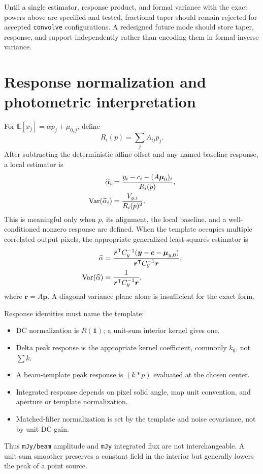 \documentclass[11pt]{article}
\newcommand{\E}{\mathbb{E}}
\newcommand{\Var}{\operatorname{Var}}
\newcommand{\code}[1]{\nolinkurl{#1}}
\begin{document}
Until a single estimator, response product, and formal variance with the exact
powers above are specified and tested, fractional taper should remain rejected
for accepted \code{convolve} configurations.  A redesigned future mode should
store taper, response, and support independently rather than encoding them in
formal inverse variance.

\section{Response normalization and photometric interpretation}
\label{sec:response}

For $\E[x_j]=\alpha p_j+\mu_{0,j}$, define
\begin{equation}
 R_i(p)=\sum_jA_{ij}p_j.
 \label{eq:template-response}
\end{equation}
After subtracting the deterministic affine offset and any named baseline
response, a local estimator is
\begin{align}
 \widehat\alpha_i&={y_i-c_i-(A\boldsymbol\mu_0)_i\over R_i(p)},
 \label{eq:alpha-hat}\\
 \Var(\widehat\alpha_i)&={V_{y,i}\over R_i(p)^2}.
 \label{eq:alpha-var}
\end{align}
This is meaningful only when $p$, its alignment, the local baseline, and a
well-conditioned nonzero response are defined.  When the template occupies
multiple correlated output pixels, the appropriate generalized least-squares
estimator is
\begin{align}
 \widehat\alpha&={\boldsymbol r^{\mathsf T}C_y^{-1}
      (\boldsymbol y-\boldsymbol c-\boldsymbol\mu_{y,0})
      \over \boldsymbol r^{\mathsf T}C_y^{-1}\boldsymbol r},
 \label{eq:gls-alpha}\\
 \Var(\widehat\alpha)&={1\over
      \boldsymbol r^{\mathsf T}C_y^{-1}\boldsymbol r},
 \label{eq:gls-alpha-var}
\end{align}
where $\boldsymbol r=A\boldsymbol p$.  A diagonal variance plane alone is
insufficient for the exact form.

Response identities must name the template:
\begin{itemize}
\item DC normalization is $R(\boldsymbol1)$; a unit-sum interior kernel gives
one.
\item Delta peak response is the appropriate kernel coefficient, commonly
$k_0$, not $\sum k$.
\item A beam-template peak response is $(k*p)$ evaluated at the chosen center.
\item Integrated response depends on pixel solid angle, map unit convention,
and aperture or template normalization.
\item Matched-filter normalization is set by the template and noise covariance,
not by unit DC gain.
\end{itemize}
Thus \code{mJy/beam} amplitude and \code{mJy} integrated flux are not
interchangeable.  A unit-sum smoother preserves a constant field in the
interior but generally lowers the peak of a point source.
\end{document}
